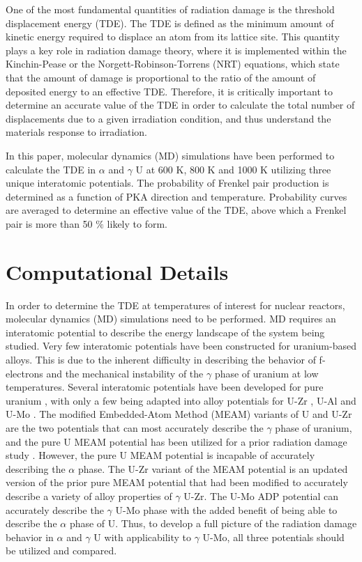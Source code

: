 \documentclass[review]{elsarticle}
\begin{document}
One of the most fundamental quantities of radiation damage is the threshold displacement energy (TDE). The TDE is defined as the minimum amount of kinetic energy required to displace an atom from its lattice site. This quantity plays a key role in radiation damage theory, where it is implemented within the Kinchin-Pease \cite{kinchinpease} or the Norgett-Robinson-Torrens (NRT) \cite{norgett1975} equations, which state that the amount of damage is proportional to the ratio of the amount of deposited energy to an effective TDE. Therefore, it is critically important to determine an accurate value of the TDE in order to calculate the total number of displacements due to a given irradiation condition, and thus understand the materials response to irradiation.

In this paper, molecular dynamics (MD) simulations have been performed to calculate the TDE in $\alpha$ and $\gamma$ U at 600 K, 800 K and 1000 K utilizing three unique interatomic potentials. The probability of Frenkel pair production is determined as a function of PKA direction and temperature. Probability curves are averaged to determine an effective value of the TDE, above which a Frenkel pair is more than 50 $\%$ likely to form. 

\section{Computational Details}
In order to determine the TDE at temperatures of interest for nuclear reactors, molecular dynamics (MD) \cite{abraham1986, allen1987} simulations need to be performed. MD requires an interatomic potential to describe the energy landscape of the system being studied. Very few interatomic potentials have been constructed for uranium-based alloys. This is due to the inherent difficulty in describing the behavior of f-electrons and the mechanical instability of the $\gamma$ phase of uranium at low temperatures. Several interatomic potentials have been developed for pure uranium \cite{beeler_meam, beelerASTM, fernandez2014, li2011, smirnova2012, li2012}, with only a few being adapted into alloy potentials for U-Zr \cite{moore2015}, U-Al \cite{pascuet2012} and U-Mo \cite{smirnovaUMo}. The modified Embedded-Atom Method (MEAM) variants of U and U-Zr \cite{beeler_meam, moore2015} are the two potentials that can most accurately describe the $\gamma$ phase of uranium, and the pure U MEAM potential \cite{beeler_meam} has been utilized for a prior radiation damage study \cite{miao2015}. However, the pure U MEAM potential is incapable of accurately describing the $\alpha$ phase. The U-Zr variant of the MEAM potential is an updated version of the prior pure MEAM potential that had been modified to accurately describe a variety of alloy properties of $\gamma$ U-Zr. The U-Mo ADP \cite{smirnovaADP} potential can accurately describe the $\gamma$ U-Mo phase with the added benefit of being able to describe the $\alpha$ phase of U. Thus, to develop a full picture of the radiation damage behavior in $\alpha$ and $\gamma$ U with applicability to $\gamma$ U-Mo, all three potentials should be utilized and compared.
\end{document}

